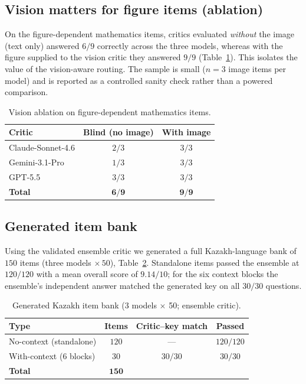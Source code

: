 \documentclass[11pt]{article}
\begin{document}
\subsection{Vision matters for figure items (ablation)}
On the figure-dependent mathematics items, critics evaluated \emph{without} the
image (text only) answered $6/9$ correctly across the three models, whereas with
the figure supplied to the vision critic they answered $9/9$
(Table~\ref{tab:vision}). This isolates the value of the vision-aware routing.
The sample is small ($n=3$ image items per model) and is reported as a
controlled sanity check rather than a powered comparison.

\begin{table}[h]
\centering
\caption{Vision ablation on figure-dependent mathematics items.}
\label{tab:vision}
\begin{tabular}{lcc}
\toprule
Critic & Blind (no image) & With image \\
\midrule
Claude-Sonnet-4.6 & $2/3$ & $3/3$ \\
Gemini-3.1-Pro    & $1/3$ & $3/3$ \\
GPT-5.5           & $3/3$ & $3/3$ \\
\midrule
\textbf{Total}    & $\mathbf{6/9}$ & $\mathbf{9/9}$ \\
\bottomrule
\end{tabular}
\end{table}

\subsection{Generated item bank}
Using the validated ensemble critic we generated a full Kazakh-language bank of
$150$ items (three models $\times\,50$), Table~\ref{tab:bank}. Standalone items
passed the ensemble at $120/120$ with a mean overall score of $9.14/10$; for the
six context blocks the ensemble's independent answer matched the generated key
on all $30/30$ questions.

\begin{table}[h]
\centering
\caption{Generated Kazakh item bank (3 models $\times$ 50; ensemble critic).}
\label{tab:bank}
\begin{tabular}{lccc}
\toprule
Type & Items & Critic--key match & Passed \\
\midrule
No-context (standalone) & $120$ & --- & $120/120$ \\
With-context (6 blocks) & $30$  & $30/30$ & $30/30$ \\
\midrule
\textbf{Total} & $\mathbf{150}$ & & \\
\bottomrule
\end{tabular}
\end{table}
\end{document}

